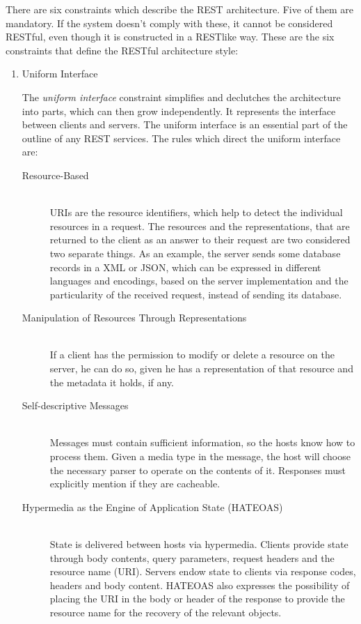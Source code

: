 There are six constraints which describe the REST architecture. Five of them are mandatory. If the system doesn't comply with these, it cannot be considered RESTful, even though it is constructed in a RESTlike way.
These are the six constraints that define the RESTful architecture style:
\begin{enumerate}[label=\arabic*)]
  \item Uniform Interface

    The \textit{uniform interface} constraint simplifies and declutches the architecture into parts, which can then grow independently. It represents the interface between clients and servers. The uniform interface is an essential part of the outline of any REST services.  The rules which direct the uniform interface are:

    \begin{description}
      \item[Resource-Based] \hfill \\
        URIs are the resource identifiers, which help to detect the individual resources in a request. The resources and the representations, that are returned to the client as an answer to their request are two considered two separate things. As an example, the server sends some database records in a XML or JSON, which can be expressed in different languages and encodings, based on the server implementation and the particularity of the received request, instead of sending its database.

      \item[Manipulation of Resources Through Representations] \hfill \\
        If a client has the permission to modify or delete a resource on the server, he can do so, given he has a representation of that resource and the metadata it holds, if any.

      \item[Self-descriptive Messages] \hfill \\
        Messages must contain sufficient information, so the hosts know how to process them. Given a media type in the message, the host will choose the necessary parser to operate on the contents of it. Responses must explicitly mention if they are cacheable.

      \item[Hypermedia as the Engine of Application State (HATEOAS)] \hfill \\
        State is delivered between hosts via hypermedia. Clients provide state through body contents, query parameters, request headers and the resource name (URI). Servers endow state to clients via response codes, headers and body content.
        HATEOAS also expresses the possibility of placing the URI in the body or header of the response to provide the resource name for the recovery of the relevant objects.
    \end{description}


\end{enumerate}
